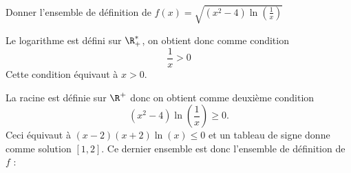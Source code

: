 \documentclass[a4paper, 11pt,reqno]{article}
\begin{document}


\begin{exercice}
Donner l'ensemble de définition de $f(x) = \sqrt{ (x^2-4)\ln\left(\frac{1}{x}\right)}$
\end{exercice}


\begin{correction}


Le logarithme est défini sur $\R^*_+$, on obtient donc comme condition 
$$\frac{1}{x}>0$$
Cette  condition équivaut à $x>0$.

La racine est définie sur $\R^+$ donc on obtient comme deuxième condition 
$$(x^2-4)\ln(\frac{1}{x}) \geq 0.$$
Ceci équivaut à $(x-2)(x+2) \ln(x)\leq 0$ et un tableau de signe donne comme solution $[1,2]$.
Ce dernier ensemble est donc l'ensemble de définition de $f$ :

\begin{center}
\end{center}
\end{correction}
\end{document}
